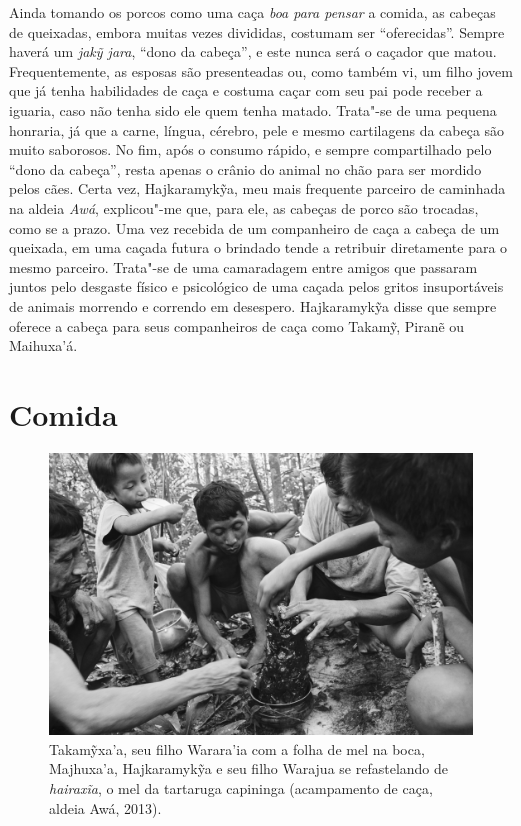 Ainda tomando os porcos como uma caça \emph{boa para pensar} a comida,
as cabeças de queixadas, embora muitas vezes divididas, costumam ser
``oferecidas''. Sempre haverá um \emph{jakỹ jara}, ``dono da cabeça'', e
este nunca será o caçador que matou. Frequentemente, as esposas são
presenteadas ou, como também vi, um filho jovem que já tenha habilidades
de caça e costuma caçar com seu pai pode receber a iguaria, caso não
tenha sido ele quem tenha matado. Trata"-se de uma pequena honraria, já
que a carne, língua, cérebro, pele e mesmo cartilagens da cabeça são
muito saborosos. No fim, após o consumo rápido, e sempre compartilhado
pelo ``dono da cabeça'', resta apenas o crânio do animal no chão para
ser mordido pelos cães. Certa vez, Hajkaramykỹa, meu mais frequente
parceiro de caminhada na aldeia \emph{Awá}, explicou"-me que, para ele,
as cabeças de porco são trocadas, como se a prazo. Uma vez recebida de
um companheiro de caça a cabeça de um queixada, em uma caçada futura o
brindado tende a retribuir diretamente para o mesmo parceiro. Trata"-se
de uma camaradagem entre amigos que passaram juntos pelo desgaste físico
e psicológico de uma caçada pelos gritos insuportáveis de animais
morrendo e correndo em desespero. Hajkaramykỹa disse que sempre oferece
a cabeça para seus companheiros de caça como Takamỹ, Piranẽ ou
Maihuxa'á.

\section{Comida}

\begin{figure}[!hb]
\centering
  \includegraphics[width=\textwidth]{./imgs/IMG_1672}
\caption{Takamỹxa'a, seu filho Warara’ia com a folha de mel na boca, Majhuxa’a,
Hajkaramykỹa e seu filho Warajua se refastelando de \emph{hairaxĩa}, o mel da tartaruga
capininga (acampamento de caça, aldeia Awá, 2013).}
\end{figure}

